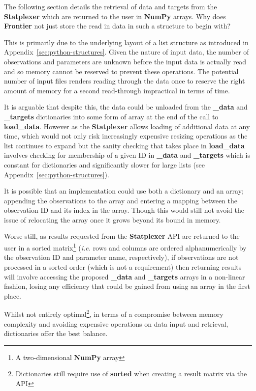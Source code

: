 The following section details the retrieval of data and targets from the
\textbf{Statplexer} which are returned to the user in \textbf{NumPy} arrays. Why
does \textbf{Frontier} not just store the read in data in such a structure to
begin with?

This is primarily due to the underlying layout of a list structure as introduced
in Appendix~\ref{sec:python-structures}. Given the nature of input data,
the number of observations and parameters are unknown before the input
data is actually read and so memory cannot be reserved to prevent these operations.
The potential number of input files renders reading through the data once to
reserve the right amount of memory for a second read-through impractical in
terms of time.

It is arguable that despite this, the data could be unloaded from the
\textbf{\_data} and \textbf{\_targets} dictionaries into some form of array at
the end of the call to \textbf{load\_data}. However as the \textbf{Statplexer}
allows loading of additional data at any time, which would not only risk
increasingly expensive resizing operations as the list continues to expand but
the sanity checking that takes place in \textbf{load\_data} involves checking
for membership of a given ID in \textbf{\_data} and \textbf{\_targets} which is
constant for dictionaries and significantly slower for large lists (see
Appendix~\ref{sec:python-structures}).

It is possible that an implementation could use both a dictionary and an array;
appending the observations to the array and entering a mapping between the
observation ID and its index in the array.  Though this would still not avoid
the issue of relocating the array once it grows beyond its bound in memory.

Worse still, as results requested from the \textbf{Statplexer} API are returned
to the user in a sorted matrix\footnote{A two-dimensional \textbf{NumPy} array}
(\textit{i.e.} rows and columns are ordered alphanumerically by the observation
ID and parameter name, respectively), if observations are not processed in a
sorted order (which is not a requirement) then returning results will involve
accessing the proposed \textbf{\_data} and \textbf{\_targets} arrays in a
non-linear fashion, losing any efficiency that could be gained from using an
array in the first place.

Whilst not entirely optimal\footnote{Dictionaries still require use of
\textbf{sorted} when creating a result matrix via the API}, in terms of a
compromise between memory complexity and avoiding expensive operations on data
input and retrieval, dictionaries offer the best balance.


